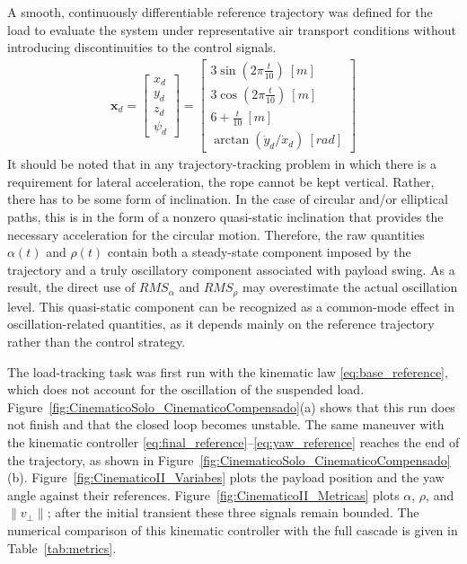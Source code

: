 \documentclass[sn-mathphys-num]{sn-jnl}
\theoremstyle{thmstyleone}%
\theoremstyle{thmstyletwo}%
\theoremstyle{thmstylethree}%
\begin{document}
A smooth, continuously differentiable reference trajectory was defined for the load to evaluate the system under representative air transport conditions without introducing discontinuities to the control signals.
\begin{eqnarray}
    \mathbf{x}_d = \begin{bmatrix} x_d \\ y_d \\ z_d \\ \psi_d\end{bmatrix}= \begin{bmatrix} 3 \sin(2\pi \frac{t}{10}) \ [m] \\  3 \cos(2\pi \frac{t}{10}) \ [m]\\ 6+\frac{t}{10} \ [m] \\ \arctan(\dot{y}_d / \dot{x}_d) \ [rad]\end{bmatrix}
\end{eqnarray}
It should be noted that in any trajectory-tracking problem in which there is a requirement for lateral acceleration, the rope cannot be kept vertical. Rather, there has to be some form of inclination. In the case of circular and/or elliptical paths, this is in the form of a nonzero quasi-static inclination that provides the necessary acceleration for the circular motion. Therefore, the raw quantities $\alpha(t)$ and $\rho(t)$ contain both a steady-state component imposed by the trajectory and a truly oscillatory component associated with payload swing. As a result, the direct use of $RMS_\alpha$ and $RMS_\rho$ may overestimate the actual oscillation level. This quasi-static component can be recognized as a common-mode effect in oscillation-related quantities, as it depends mainly on the reference trajectory rather than the control strategy. 

The load-tracking task was first run with the kinematic law \eqref{eq:base_reference}, which does not account for the oscillation of the suspended load. Figure~\ref{fig:CinematicoSolo_CinematicoCompensado}(a) shows that this run does not finish and that the closed loop becomes unstable. The same maneuver with the kinematic controller \eqref{eq:final_reference}--\eqref{eq:yaw_reference} reaches the end of the trajectory, as shown in Figure~\ref{fig:CinematicoSolo_CinematicoCompensado}(b). Figure~\ref{fig:CinematicoII_Variabes} plots the payload position and the yaw angle against their references. Figure~\ref{fig:CinematicoII_Metricas} plots \(\alpha\), \(\rho\), and \(\|v_\perp\|\); after the initial transient these three signals remain bounded. The numerical comparison of this kinematic controller with the full cascade is given in Table~\ref{tab:metrics}.
\end{document}

